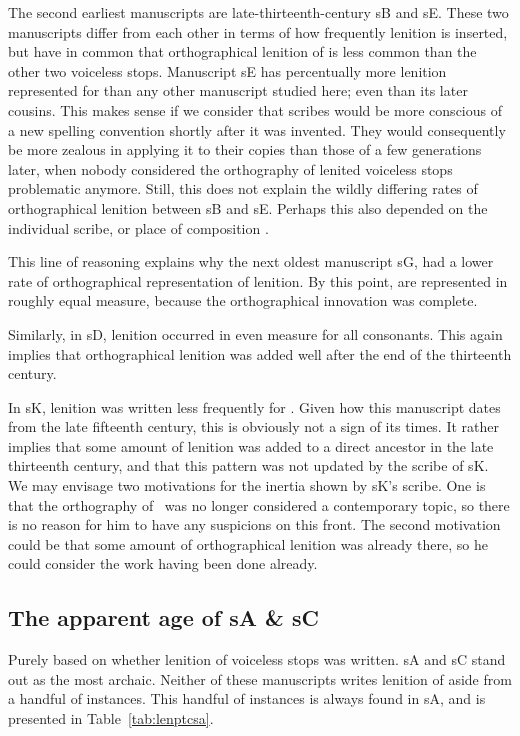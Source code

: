 The second earliest manuscripts are late-thirteenth-century \gls{sB} and \gls{sE}. These two manuscripts differ from each other in terms of how frequently lenition is inserted, but have in common that orthographical lenition of  is less common than the other two voiceless stops. Manuscript \gls{sE} has percentually more lenition represented for  than any other manuscript studied here; even than its later cousins. This makes sense if we consider that scribes would be more conscious of a new spelling convention shortly after it was invented. They would consequently be more zealous in applying it to their copies than those of a few generations later, when nobody considered the orthography of lenited voiceless stops problematic anymore. Still, this does not explain the wildly differing rates of orthographical lenition between \gls{sB} and \gls{sE}. Perhaps this also depended on the individual scribe, or place of composition .

This line of reasoning explains why the next oldest manuscript \gls{sG}, had a lower rate of orthographical representation of lenition. By this point,  are represented in roughly equal measure, because the orthographical innovation was complete.

Similarly, in \gls{sD}, lenition occurred in even measure for all consonants. This again implies that orthographical lenition was added well after the end of the thirteenth century. 

In \gls{sK}, lenition was written less frequently for . Given how this manuscript dates from the late fifteenth century, this is obviously not a sign of its times. It rather implies that some amount of lenition was added to a direct ancestor in the late thirteenth century, and that this pattern was not updated by the scribe of \gls{sK}. We may envisage two motivations for the inertia shown by \gls{sK}'s scribe. One is that the orthography of \lT\ was no longer considered a contemporary topic, so there is no reason for him to have any suspicions on this front. The second motivation could be that some amount of orthographical lenition was already there, so he could consider the work having been done already. 

\subsection{The apparent age of \gls{sA} \& \gls{sC}}
\label{sec:glsa--glsc}


Purely based on whether lenition of voiceless stops was written. \gls{sA} and \gls{sC} stand out as the most archaic. Neither of these manuscripts writes lenition of  aside from a handful of instances. This handful of instances is always found in \gls{sA}, and is presented in Table~\ref{tab:lenptcsa}.

